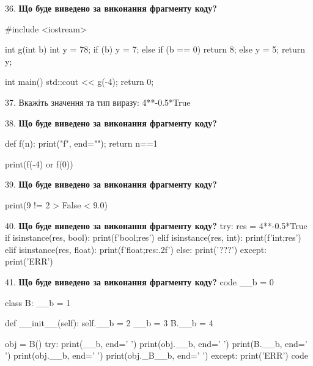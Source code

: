 \documentclass[11pt]{article}
\begin{document}
36. \textbf{Що буде виведено за виконання фрагменту коду?}

#include <iostream>

int g(int b){
    int y = 78;
    if (b) 
        y = 7;
    else if (b == 0)
         return 8;
    else
         y = 5;
    return y;
}

int main(){
    std::cout << g(-4);
    return 0;
}

\par\vspace{5mm}

37. 
Вкажіть значення та тип виразу:
4**-0.5*True
\par\vspace{5mm}

38. \textbf{Що буде виведено за виконання фрагменту коду?}

def f(n):
    print("f", end="");
    return n==1

print(f(-4) or f(0))
\par\vspace{5mm}

39. \textbf{Що буде виведено за виконання фрагменту коду?}

print(9 != 2 > False < 9.0)
\par\vspace{5mm}

40. \textbf{Що буде виведено за виконання фрагменту коду?}
try:
    res = 4**-0.5*True
    if isinstance(res, bool):
        print(f'bool;{res}')
    elif isinstance(res, int):
        print(f'int;{res}')
    elif isinstance(res, float):
        print(f'float;{res:.2f}')
    else:
        print('???')
except:
    print('ERR')
\par\vspace{5mm}

41. \textbf{Що буде виведено за виконання фрагменту коду?}
code
__b = 0

class B:
    __b = 1
    
    def __init__(self):
        self.__b = 2
        __b = 3
        B.__b = 4

obj = B()
try:
    print(__b, end=' ')
    print(obj.__b, end=' ')
    print(B.__b, end=' ')
    print(obj.__b, end=' ')
    print(obj._B__b, end=' ')
except:
    print('ERR')
code
\par\vspace{5mm}
\end{document}
